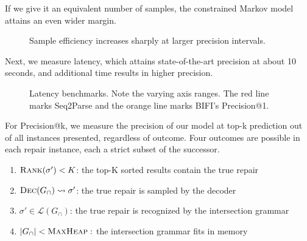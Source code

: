 If we give it an equivalent number of samples, the constrained Markov model attains an even wider margin.

\begin{figure}[H]
  \resizebox{.24\textwidth}{!}{}
  \resizebox{.24\textwidth}{!}{}
  \resizebox{.24\textwidth}{!}{}
  \resizebox{.24\textwidth}{!}{}
  \caption{Sample efficiency increases sharply at larger precision intervals.}
\end{figure}

Next, we measure latency, which attains state-of-the-art precision at about 10 seconds, and additional time results in higher precision.

\begin{figure}[H]
  \begin{center}
  \resizebox{.24\textwidth}{!}{}
  \resizebox{.24\textwidth}{!}{}
  \resizebox{.24\textwidth}{!}{}
  \end{center}
  \caption{Latency benchmarks. Note the varying axis ranges. The red line marks Seq2Parse and the orange line marks BIFI's Precision@1.}\label{fig:human}
\end{figure}

\noindent For Precision@k, we measure the precision of our model at top-k prediction out of all instances presented, regardless of outcome. Four outcomes are possible in each repair instance, each a strict subset of the successor.

\begin{enumerate}
  \item $\textsc{Rank}(\sigma') < K$: the top-K sorted results contain the true repair
  \item $\textsc{Dec}(G_\cap) \rightsquigarrow \sigma'$: the true repair is sampled by the decoder
  \item $\sigma' \in \mathcal{L}(G_\cap)$: the true repair is recognized by the intersection grammar
  \item $|G_\cap| < \textsc{MaxHeap}:$ the intersection grammar fits in memory
\end{enumerate}

